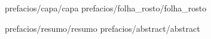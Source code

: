 \documentclass [12pt,fleqn,oneside]{book}    %
\begin{document}
\pagestyle {empty}

 {prefacios/capa/capa}           %
 {prefacios/folha_rosto/folha_rosto}     %

\pagestyle {plain}

 {prefacios/resumo/resumo}         %
 {prefacios/abstract/abstract}
\tableofcontents                    %
\listoftables                       %
\listoffigures                      %
\clearpage


\pagestyle {fancyplain}

\renewcommand{\chaptermark}[1]{\markboth{\thechapter.\ {#1}}{}}

\addtolength{\headheight}{\baselineskip}

\fancyhf{}
\fancyhead[L,L]{\nouppercase{\textsf{\leftmark}}} %
\fancyhead[R,R]{\thepage}



\setcounter{page}{0} 







%

\end{document}
